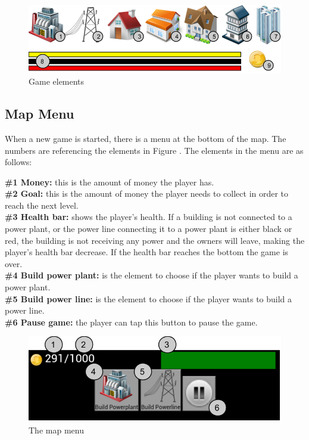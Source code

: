 	\begin{figure}[H]
		\includegraphics[width=\textwidth]{pictures/GameElements.png}
		\caption{Game elements}
		\label{ref:gameelements}
	\end{figure}

\subsection*{Map Menu}
	When a new game is started, there is a menu at the bottom of the map. The numbers are referencing 
	the elements in Figure \label{fig:mapmenuelements}. The elements in the menu are as follows:

	{\bf \#1 Money:} this is the amount of money the player has. \\
	{\bf \#2 Goal: } this is the amount of money the player needs to collect in 
	order to reach the next level.\\
	{\bf \#3 Health bar: } shows the player's health. If a building is not connected to a power plant, 
	or the power line connecting it to a power plant is either black or red, the building 
	is not receiving any power and the owners will leave, making the player's health bar decrease. 
	If the health bar reaches the bottom the game is over.\\
	{\bf \#4 Build power plant: } is the element to choose if the player wants to build a power plant. \\
	{\bf \#5 Build power line: } is the element to choose if the player wants to build a power line. \\
	{\bf \#6 Pause game: } the player can tap this button to pause the game. \\

	\begin{figure}[H]
		\includegraphics[width=\textwidth]{pictures/mapmenu.png}
		\caption{The map menu}
		\label{fig:mapmenuelements}
	\end{figure}


